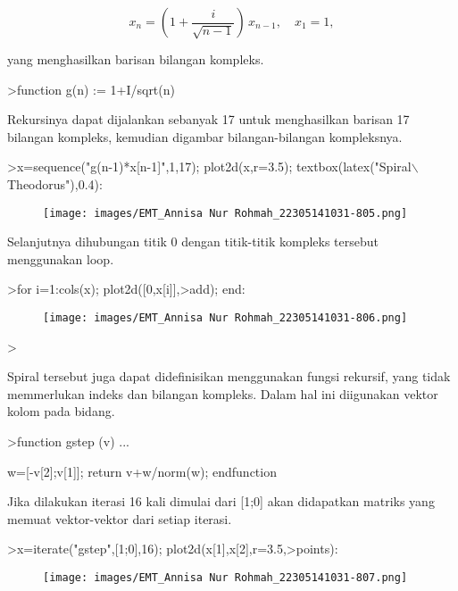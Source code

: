 \documentclass[a4paper,10pt]{article}
\begin{document}
\begin{eulernotebook}
\begin{eulercomment}
\end{eulercomment}
\begin{eulerformula}
\[
x_n = \left( 1 + \frac{i}{\sqrt{n-1}} \right) \, x_{n-1}, \quad x_1=1,
\]
\end{eulerformula}
\begin{eulercomment}
yang menghasilkan barisan bilangan kompleks.
\end{eulercomment}
\begin{eulerprompt}
>function g(n) := 1+I/sqrt(n)
\end{eulerprompt}
\begin{eulercomment}
Rekursinya dapat dijalankan sebanyak 17 untuk menghasilkan barisan 17
bilangan kompleks, kemudian digambar bilangan-bilangan kompleksnya.
\end{eulercomment}
\begin{eulerprompt}
>x=sequence("g(n-1)*x[n-1]",1,17); plot2d(x,r=3.5); textbox(latex("Spiral\(\backslash\) Theodorus"),0.4):
\end{eulerprompt}
\begin{figure}[h]
    \centering
    \texttt{[image: images/EMT\_Annisa Nur Rohmah\_22305141031-805.png]}
\end{figure}
\begin{eulercomment}
Selanjutnya dihubungan titik 0 dengan titik-titik kompleks tersebut
menggunakan loop.
\end{eulercomment}
\begin{eulerprompt}
>for i=1:cols(x); plot2d([0,x[i]],>add); end:
\end{eulerprompt}
\begin{figure}[h]
    \centering
    \texttt{[image: images/EMT\_Annisa Nur Rohmah\_22305141031-806.png]}
\end{figure}
\begin{eulerprompt}
> 
\end{eulerprompt}
\begin{eulercomment}
Spiral tersebut juga dapat didefinisikan menggunakan fungsi rekursif,
yang tidak memmerlukan indeks dan bilangan kompleks. Dalam hal ini
diigunakan vektor kolom pada bidang.
\end{eulercomment}
\begin{eulerprompt}
>function gstep (v) ...
\end{eulerprompt}
\begin{eulerudf}
  w=[-v[2];v[1]];
  return v+w/norm(w);
  endfunction
\end{eulerudf}
\begin{eulercomment}
Jika dilakukan iterasi 16 kali dimulai dari [1;0] akan didapatkan
matriks yang memuat vektor-vektor dari setiap iterasi.
\end{eulercomment}
\begin{eulerprompt}
>x=iterate("gstep",[1;0],16); plot2d(x[1],x[2],r=3.5,>points):
\end{eulerprompt}
\begin{figure}[h]
    \centering
    \texttt{[image: images/EMT\_Annisa Nur Rohmah\_22305141031-807.png]}
\end{figure}
\begin{eulercomment}


\end{eulercomment}
\end{eulernotebook}
\end{document}

